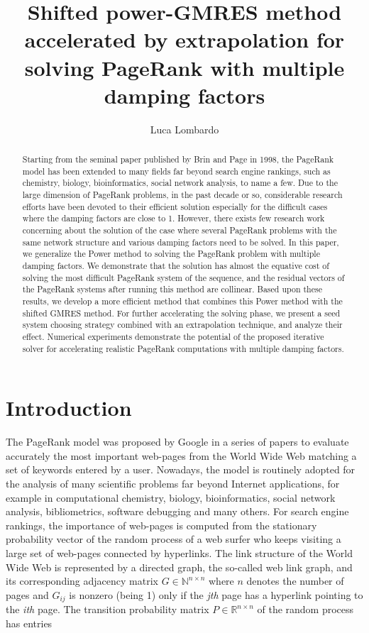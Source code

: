 \documentclass[12pt]{article}
\title{Shifted power-GMRES method accelerated by extrapolation
for solving PageRank with multiple damping factors}
\author{Luca Lombardo}
\date{}
\newcommand{\R}{\mathbb{R}}
\newcommand{\N}{\mathbb{N}}
\begin{document}
\maketitle

\begin{abstract}
    Starting from the seminal paper published by Brin and Page in 1998, the PageRank model has been extended to many fields far beyond search engine rankings, such as chemistry, biology, bioinformatics, social network analysis, to name a few. Due to the large dimension of PageRank problems, in the past decade or so, considerable research efforts have been devoted to their efficient solution especially for the difficult cases where the damping factors are close to 1. However, there exists few research work concerning about the solution of the case where several PageRank problems with the same network structure and various damping factors need to be solved. In this paper, we generalize the Power method to solving the PageRank problem with multiple damping factors. We demonstrate that the solution has almost the equative cost of solving the most difficult PageRank system of the sequence, and the residual vectors of the PageRank systems after running this method are collinear. Based upon these results, we develop a more efficient method that combines this Power method with the shifted GMRES method. For further accelerating the solving phase, we present a seed system choosing strategy combined with an extrapolation technique, and analyze their effect. Numerical experiments demonstrate the potential of the proposed iterative solver for accelerating realistic PageRank computations with multiple damping factors.
\end{abstract}
\tableofcontents
\clearpage

\section{Introduction}

The PageRank model was proposed by Google in a series of papers to evaluate accurately the most important web-pages from the World Wide Web matching a set of keywords entered by a user. Nowadays, the model is routinely adopted for the analysis of many scientific problems far beyond Internet applications, for example in computational chemistry, biology, bioinformatics, social network analysis, bibliometrics, software debugging and many others. For search engine rankings, the importance of web-pages is computed from the stationary probability vector of the random
process of a web surfer who keeps visiting a large set of web-pages connected by hyperlinks. The link structure of the World Wide Web is represented by a directed graph, the so-called web link graph, and its corresponding adjacency matrix $G \in \N^{n \times n}$ where $n$ denotes the number of pages and $G_{ij}$ is nonzero (being 1) only if the \emph{jth} page has a hyperlink pointing to the \emph{ith} page. The transition probability matrix $P \in \R^{n \times n}$ of the random process has entries
\end{document}
